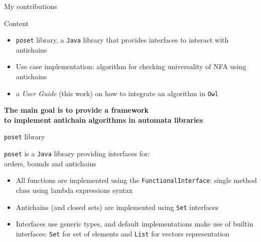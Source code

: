 \documentclass[10pt]{beamer}
\begin{document}
\begin{frame}{My contributions}
  \begin{block}{Content}
    \begin{itemize}
      \item \texttt{poset} library, a \texttt{Java} library that provides interfaces to interact with antichains \cite{poset-src}
      \item Use case implementation: algorithm for checking universality of NFA using antichains \cite{antichain-universality}
      \item a \textit{User Guide} (this work) on how to integrate an algorithm in \texttt{Owl} \cite{owl}
    \end{itemize}
    \begin{center}
      \textbf{The main goal is to provide a framework \\ to implement antichain algorithms in automata libraries}
    \end{center}
  \end{block}
\end{frame}

\begin{frame}[fragile]{\texttt{poset} library}

\begin{center}
\texttt{poset} is a \texttt{Java} library providing interfaces for: \\ orders, bounds and antichains
\end{center}

\begin{itemize}
  \item All functions are implemented using the \texttt{FunctionalInterface}: single method class using lambda expressions syntax
  \item Antichains (and closed sets) are implemented using \texttt{Set} interfaces
  \item Interfaces use generic types, and default implementations make use of builtin interfaces: \texttt{Set} for set of elements and \texttt{List} for vectors representation
\end{itemize}

\end{frame}
\end{document}
